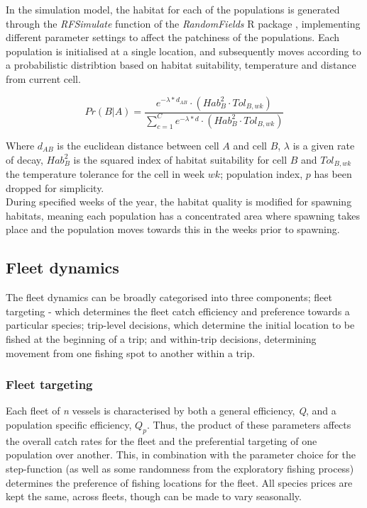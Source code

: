 \documentclass[review]{elsarticle}
\begin{document}
In the simulation model, the habitat for each of the populations is generated
through the \textit{RFSimulate} function of the \textit{RandomFields} R package
\cite{Schlater2015}, implementing different parameter settings to affect the
patchiness of the populations. Each population is initialised at a single
location, and subsequently moves according to a probabilistic distribtion based
on habitat suitability, temperature and distance from current cell. 

\begin{equation}
	Pr(B | A) = \frac{e^{-\lambda * d_{AB}} \cdot
		(Hab_{B}^2 \cdot Tol_{B,wk})}{\sum\limits_{c=1}^{C}e^{-\lambda * d} \cdot
		(Hab_{B}^2 \cdot Tol_{B,wk})}
\end{equation}

Where $d_{AB}$ is the euclidean distance between cell $A$ and cell $B$,
$\lambda$ is a given rate of decay, $Hab_{B}^2$ is the squared index of habitat
suitability for cell $B$ and $Tol_{B,wk}$ the temperature tolerance for the
cell in week $wk$; population index, $p$ has been dropped for simplicity.\\

During specified weeks of the year, the habitat quality is modified for
spawning habitats, meaning each population has a concentrated area where
spawning takes place and the population moves towards this in the weeks prior
to spawning. \\

\subsection{Fleet dynamics}

The fleet dynamics can be broadly categorised into three components; fleet
targeting - which determines the fleet catch efficiency and preference towards
a particular species; trip-level decisions, which determine the initial
location to be fished at the beginning of a trip; and within-trip decisions,
determining movement from one fishing spot to another within a trip.

\subsubsection{Fleet targeting}

Each fleet of \textit{n} vessels is characterised by both a general efficiency,
\textit{Q}, and a population specific efficiency, ${Q_{p}}$.  Thus, the product
of these parameters affects the overall catch rates for the fleet and the
preferential targeting of one population over another. This, in combination
with the parameter choice for the step-function (as well as some randomness
from the exploratory fishing process) determines the preference of fishing
locations for the fleet.  All species prices are kept the same, across fleets,
though can be made to vary seasonally.  
\end{document}
